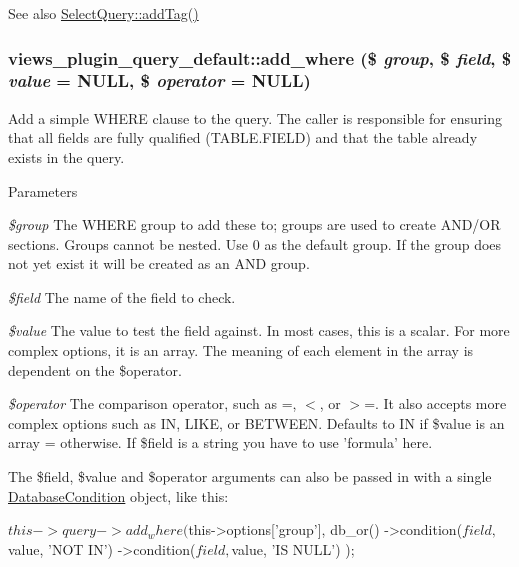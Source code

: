 \begin{DoxySeeAlso}{See also}
\hyperlink{classSelectQuery_a2efa69685cefbe98f824f5c5e97e092f}{SelectQuery::addTag()} 
\end{DoxySeeAlso}
\hypertarget{classviews__plugin__query__default_a5a70ca8325494614f66096a38b8625d7}{
\subsubsection[{add\_\-where}]{\setlength{\rightskip}{0pt plus 5cm}views\_\-plugin\_\-query\_\-default::add\_\-where (\$ {\em group}, \/  \$ {\em field}, \/  \$ {\em value} = {\ttfamily NULL}, \/  \$ {\em operator} = {\ttfamily NULL})}}
\label{classviews__plugin__query__default_a5a70ca8325494614f66096a38b8625d7}
Add a simple WHERE clause to the query. The caller is responsible for ensuring that all fields are fully qualified (TABLE.FIELD) and that the table already exists in the query.


\begin{DoxyParams}{Parameters}
\item[{\em \$group}]The WHERE group to add these to; groups are used to create AND/OR sections. Groups cannot be nested. Use 0 as the default group. If the group does not yet exist it will be created as an AND group. \item[{\em \$field}]The name of the field to check. \item[{\em \$value}]The value to test the field against. In most cases, this is a scalar. For more complex options, it is an array. The meaning of each element in the array is dependent on the \$operator. \item[{\em \$operator}]The comparison operator, such as =, $<$, or $>$=. It also accepts more complex options such as IN, LIKE, or BETWEEN. Defaults to IN if \$value is an array = otherwise. If \$field is a string you have to use 'formula' here.\end{DoxyParams}
The \$field, \$value and \$operator arguments can also be passed in with a single \hyperlink{classDatabaseCondition}{DatabaseCondition} object, like this: 
\begin{DoxyCode}
   $this->query->add_where(
     $this->options['group'],
     db_or()
       ->condition($field, $value, 'NOT IN')
       ->condition($field, $value, 'IS NULL')
   );
\end{DoxyCode}


